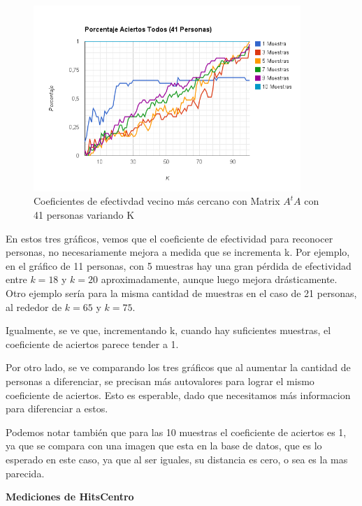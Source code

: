\begin{figure}[H]
\includegraphics[width=0.90\textwidth]{img/image12.png}
     \caption{Coeficientes de efectivdad vecino más cercano con Matrix $A^tA$ con 41 personas variando K}
\end{figure}

En estos tres gr\'aficos, vemos que el coeficiente de efectividad para reconocer personas, no necesariamente mejora a medida que se incrementa k. Por ejemplo, en el gr\'afico de 11 personas, con 5 muestras hay una gran p\'erdida de efectividad entre $k=18$ y $k=20$ aproximadamente, aunque luego mejora dr\'asticamente. Otro ejemplo ser\'ia para la misma cantidad de muestras en el caso de 21 personas, al rededor de $k=65$ y $k=75$.

Igualmente, se ve que, incrementando k, cuando hay suficientes muestras, el coeficiente de aciertos parece tender a 1.

Por otro lado, se ve comparando los tres gr\'aficos que al aumentar la cantidad de personas a diferenciar, se precisan m\'as autovalores para lograr el mismo coeficiente de aciertos. Esto es esperable, dado que necesitamos m\'as informacion para diferenciar a estos.

Podemos notar tambi\'en que para las 10 muestras el coeficiente de aciertos es 1, ya que se compara con una imagen que esta en la base de datos, que es lo esperado en este caso, ya que al ser iguales, su distancia es cero, o sea es la mas parecida.

\textbf{Mediciones de HitsCentro }

